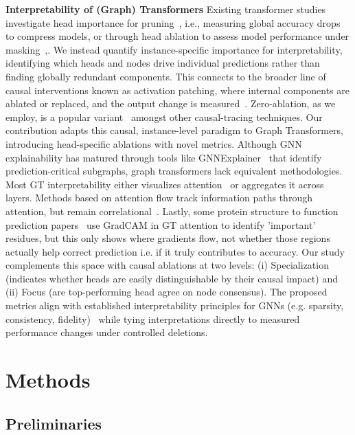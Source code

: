 \documentclass[lettersize,journal]{IEEEtran}
\begin{document}
\textbf{Interpretability of (Graph) Transformers}
Existing transformer studies investigate head importance for pruning~\cite{michel_are_2019}, i.e., measuring global accuracy drops to compress models, or through head ablation to assess model performance under masking~\cite{pochinkov_investigating_nodate},\cite{bahador_mechanistic_nodate}. We instead quantify instance-specific importance for interpretability, identifying which heads and nodes drive individual predictions rather than finding globally redundant components. 
This connects to the broader line of causal interventions known as activation patching, where internal components are ablated or replaced, and the output change is measured~\cite{heimersheim_how_2024}\cite{zhang_towards_2024}. Zero-ablation, as we employ, is a popular variant~\cite{heimersheim_how_2024} amongst other causal-tracing techniques. Our contribution adapts this causal, instance-level paradigm to Graph Transformers, introducing head-specific ablations with novel metrics.
Although GNN explainability has matured through tools like GNNExplainer~\cite{ying_gnnexplainer_2019} that identify prediction-critical subgraphs, graph transformers lack equivalent methodologies. Most GT interpretability either visualizes attention~\cite{hussain_global_2022} or aggregates it across layers. Methods based on attention flow track information paths through attention, but remain correlational~\cite{el_towards_2025}. Lastly, some protein structure to function prediction papers~\cite{gu_hierarchical_2023 } use GradCAM in GT attention to identify 'important' residues, but this only shows where gradients flow, not whether those regions actually
help correct prediction i.e. if it truly contributes to accuracy. Our study complements this space with causal ablations at two levels: (i) Specialization (indicates whether heads are easily distinguishable
by their causal impact) and (ii) Focus (are top-performing head agree on node consensus). The proposed metrics align with established interpretability principles for GNNs (e.g. sparsity, consistency, fidelity)~\cite{lukyanov_robustness_2025} while tying interpretations directly to measured performance changes under controlled deletions.



\section{Methods}



\subsection{Preliminaries}
\end{document}
